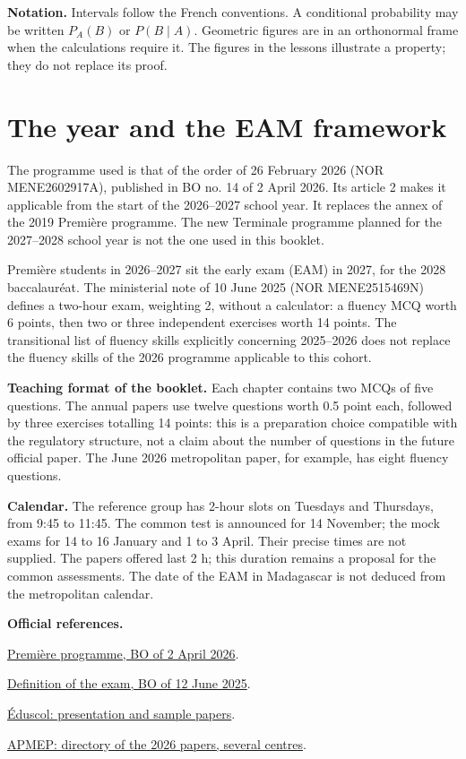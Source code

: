 \textbf{Notation.} Intervals follow the French conventions. A conditional probability may be written $P_A(B)$ or $P(B\mid A)$. Geometric figures are in an orthonormal frame when the calculations require it. The figures in the lessons illustrate a property; they do not replace its proof.

\chapter*{The year and the EAM framework}
The programme used is that of the order of 26 February 2026 (NOR MENE2602917A), published in BO no. 14 of 2 April 2026. Its article 2 makes it applicable from the start of the 2026--2027 school year. It replaces the annex of the 2019 Première programme. The new Terminale programme planned for the 2027--2028 school year is not the one used in this booklet.

Première students in 2026--2027 sit the early exam (EAM) in 2027, for the 2028 baccalauréat. The ministerial note of 10 June 2025 (NOR MENE2515469N) defines a two-hour exam, weighting 2, without a calculator: a fluency MCQ worth 6 points, then two or three independent exercises worth 14 points. The transitional list of fluency skills explicitly concerning 2025--2026 does not replace the fluency skills of the 2026 programme applicable to this cohort.

\textbf{Teaching format of the booklet.} Each chapter contains two MCQs of five questions. The annual papers use twelve questions worth \num{0,5} point each, followed by three exercises totalling 14 points: this is a preparation choice compatible with the regulatory structure, not a claim about the number of questions in the future official paper. The June 2026 metropolitan paper, for example, has eight fluency questions.

\textbf{Calendar.} The reference group has 2-hour slots on Tuesdays and Thursdays, from 9:45 to 11:45. The common test is announced for 14 November; the mock exams for 14 to 16 January and 1 to 3 April. Their precise times are not supplied. The papers offered last 2 h; this duration remains a proposal for the common assessments. The date of the EAM in Madagascar is not deduced from the metropolitan calendar.

\textbf{Official references.}\par
\href{https://www.education.gouv.fr/bo/2026/Hebdo14/MENE2602917A}{Première programme, BO of 2 April 2026}.\par
\href{https://www.education.gouv.fr/bo/2025/Hebdo24/MENE2515469N}{Definition of the exam, BO of 12 June 2025}.\par
\href{https://eduscol.education.gouv.fr/5688/epreuve-anticipee-de-mathematiques-aux-baccalaureats-general-et-technologique}{Éduscol: presentation and sample papers}.\par
\href{https://www.apmep.fr/Epreuve-anticipee-2026}{APMEP: directory of the 2026 papers, several centres}.
\tableofcontents
\mxnewpage
